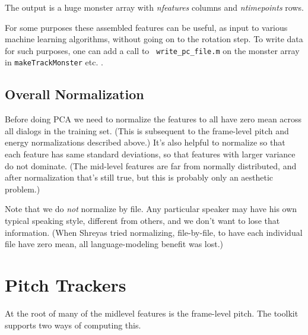 \documentclass[11pt]{article}
\begin{document}
The output is a huge monster array with {\it nfeatures} columns and
{\it ntimepoints} rows.

For some purposes these assembled features can be useful, as input to
various machine learning algorithms, without going on to the rotation
step.  To write data for such purposes, one can add a call to {\tt
  write\_pc\_file.m} on the monster array in {\tt makeTrackMonster}
etc. .


\subsection{Overall Normalization}

Before doing PCA we need to normalize the features to all have zero
mean across all dialogs in the training set.  (This is subsequent to
the frame-level pitch and energy normalizations described above.)
It's also helpful to normalize so that each feature has same standard
deviations, so that features with larger variance do not dominate.
(The mid-level features are far from normally distributed, and after
normalization that's still true, but this is probably only an
aesthetic problem.)


Note that we do {\em not} normalize by file.  Any particular speaker
may have his own typical speaking style, different from others, and we
don't want to lose that information.  (When Shreyas tried normalizing,
file-by-file, to have each individual file have zero mean, all
language-modeling benefit was lost.)

\section{Pitch Trackers}   \label{sec:pitch}

At the root of many of the midlevel features is the frame-level pitch.
The toolkit supports two ways of computing this.  
\end{document}
